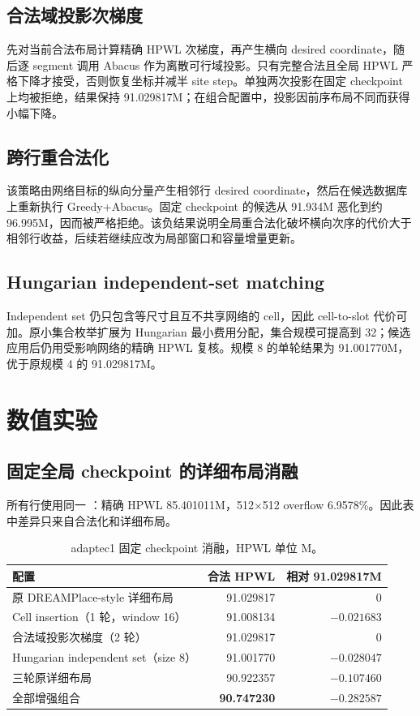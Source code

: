 \documentclass[11pt,a4paper]{ctexart}
\newcommand{\code}[1]{\texttt{\detokenize{#1}}}
\begin{document}
\subsection{合法域投影次梯度}

先对当前合法布局计算精确 HPWL 次梯度，再产生横向 desired coordinate，随后逐 segment 调用 Abacus 作为离散可行域投影。只有完整合法且全局 HPWL 严格下降才接受，否则恢复坐标并减半 site step。单独两次投影在固定 checkpoint 上均被拒绝，结果保持 91.029817M；在组合配置中，投影因前序布局不同而获得小幅下降。

\subsection{跨行重合法化}

该策略由网络目标的纵向分量产生相邻行 desired coordinate，然后在候选数据库上重新执行 Greedy+Abacus。固定 checkpoint 的候选从 91.934M 恶化到约 96.995M，因而被严格拒绝。该负结果说明全局重合法化破坏横向次序的代价大于相邻行收益，后续若继续应改为局部窗口和容量增量更新。

\subsection{Hungarian independent-set matching}

Independent set 仍只包含等尺寸且互不共享网络的 cell，因此 cell-to-slot 代价可加。原小集合枚举扩展为 Hungarian 最小费用分配，集合规模可提高到 32；候选应用后仍用受影响网络的精确 HPWL 复核。规模 8 的单轮结果为 91.001770M，优于原规模 4 的 91.029817M。

\section{数值实验}

\subsection{固定全局 checkpoint 的详细布局消融}

所有行使用同一 \code{global.pl}：精确 HPWL 85.401011M，512$\times$512 overflow 6.9578\%。因此表中差异只来自合法化和详细布局。

\begin{table}[H]
\centering
\caption{adaptec1 固定 checkpoint 消融，HPWL 单位 M。}
\label{tab:legal-ablation}
\begin{tabular}{lrr}
\toprule
配置 & 合法 HPWL & 相对 91.029817M\\
\midrule
原 DREAMPlace-style 详细布局 & 91.029817 & 0\\
Cell insertion（1 轮，window 16） & 91.008134 & $-0.021683$\\
合法域投影次梯度（2 轮） & 91.029817 & 0\\
Hungarian independent set（size 8） & 91.001770 & $-0.028047$\\
三轮原详细布局 & 90.922357 & $-0.107460$\\
全部增强组合 & \textbf{90.747230} & $\mathbf{-0.282587}$\\
\bottomrule
\end{tabular}
\end{table}
\end{document}

